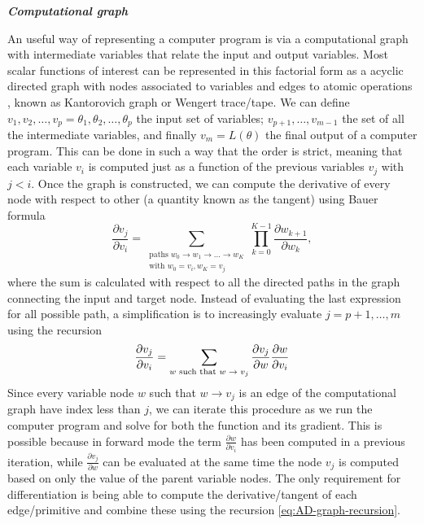 \vspace*{10px}
\noindent \textbf{\textit{Computational graph}}
\vspace*{5px}

An useful way of representing a computer program is via a computational graph with intermediate variables that relate the input and output variables. 
Most scalar functions of interest can be represented in this factorial form as a acyclic directed graph with nodes associated to variables and edges to atomic operations \cite{griewank2008evaluatingderivatives, Griewack-on-AD}, known as Kantorovich graph \cite{kantorovich1957mathematical} or Wengert trace/tape\cite{Wengert_1964, Bauer_1974}. 
We can define $v_1, v_2, \ldots, v_p = \theta_1, \theta_2, \ldots, \theta_p$ the input set of variables; $v_{p+1}, \ldots, v_{m-1}$ the set of all the intermediate variables, and finally $v_m = L(\theta)$ the final output of a computer program. 
This can be done in such a way that the order is strict, meaning that each variable $v_i$ is computed just as a function of the previous variables $v_j$ with $j < i$. 
Once the graph is constructed, we can compute the derivative of every node with respect to other (a quantity known as the tangent) using Bauer formula \cite{Bauer_1974, Oktay_randomized-AD}
\begin{equation}
    \frac{\partial v_j}{\partial v_i}
    = 
    \sum_{\substack{ \text{paths }w_0 \rightarrow w_1 \rightarrow \ldots \rightarrow w_K \\
                    \text{with } w_0=v_i, w_K = v_j}}
    \prod_{k=0}^{K-1} \frac{\partial w_{k+1}}{\partial w_{k}},
\end{equation}
where the sum is calculated with respect to all the directed paths in the graph connecting the input and target node.
Instead of evaluating the last expression for all possible path, a simplification is to increasingly evaluate $j=p+1, \ldots, m$ using the recursion 
\begin{equation}
    \frac{\partial v_j}{\partial v_i}
    = 
    \sum_\text{$w$\text{ such that} $w \rightarrow v_j$}
    \frac{\partial v_j}{\partial w}
    \frac{\partial w}{\partial v_i} 
    \label{eq:AD-graph-recursion}
\end{equation}
Since every variable node $w$ such that $w \rightarrow v_j$ is an edge of the computational graph have index less than $j$, we can iterate this procedure as we run the computer program and solve for both the function and its gradient.
This is possible because in forward mode the term $\frac{\partial w}{\partial v_i}$ has been computed in a previous iteration, while $\frac{\partial v_j}{\partial w}$ can be evaluated at the same time the node $v_j$ is computed based on only the value of the parent variable nodes. 
The only requirement for differentiation is being able to compute the derivative/tangent of each edge/primitive and combine these using the recursion \eqref{eq:AD-graph-recursion}.

